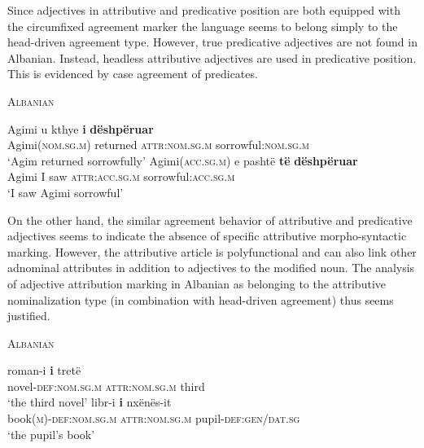 Since adjectives in attributive and predicative position are both equipped with the circumfixed agreement marker the language seems to belong simply to the head-driven agreement type. However, true predicative adjectives are not found in Albanian. Instead, headless attributive adjectives are used in predicative position. This is evidenced by case agreement of predicates.
\begin{exe}
\ex \textsc{Albanian} \citep{demiraj1998}
\begin{xlist}
\ex
\gll	Agimi {u kthye} \textbf{i} \textbf{dëshpëruar}\\
	Agimi(\textsc{nom.sg.m}) returned \textsc{attr:nom.sg.m} sorrowful:\textsc{nom.sg.m}\\
\glt	‘Agim returned sorrowfully’
\ex
\gll	Agimi(\textsc{acc.sg.m}) e pashtë \textbf{të} \textbf{dëshpëruar}\\
	Agimi I saw \textsc{attr:acc.sg.m} sorrowful:\textsc{acc.sg.m}\\
\glt	‘I saw Agimi sorrowful’
\end{xlist}
\end{exe}
On the other hand, the similar agreement behavior of attributive and predicative adjectives seems to indicate the absence of specific attributive morpho-syntactic marking. However, the attributive article is polyfunctional and can also link other adnominal attributes in addition to adjectives to the modified noun. The analysis of adjective attribution marking in Albanian as belonging to the attributive nominalization type (in combination with head-driven agreement) thus seems justified.
\begin{exe}
\ex \textsc{Albanian} \citep{demiraj1998}
\begin{xlist}
\ex
\gll	roman-i 			\textbf{i} 			tretë\\
	novel-\textsc{def:nom.sg.m} \textsc{attr:nom.sg.m} third\\
\glt	‘the third novel’
\ex	
\gll	libr-i 	\textbf{i}  nxënës-it\\
	book(\textsc{m})-\textsc{def:nom.sg.m} \textsc{attr:nom.sg.m} pupil-\textsc{def:gen/dat.sg}\\
\glt	‘the pupil's book’
\end{xlist}
\end{exe}

